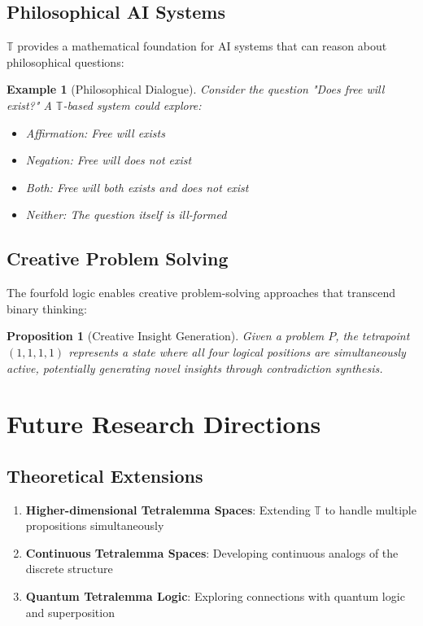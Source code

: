 \documentclass[11pt,a4paper]{article}
\newtheorem{proposition}{Proposition}
\newtheorem{example}{Example}
\begin{document}
\subsection{Philosophical AI Systems}

$\mathbb{T}$ provides a mathematical foundation for AI systems that can reason about philosophical questions:

\begin{example}[Philosophical Dialogue]
Consider the question "Does free will exist?" A $\mathbb{T}$-based system could explore:
\begin{itemize}
    \item Affirmation: Free will exists
    \item Negation: Free will does not exist
    \item Both: Free will both exists and does not exist
    \item Neither: The question itself is ill-formed
\end{itemize}
\end{example}

\subsection{Creative Problem Solving}

The fourfold logic enables creative problem-solving approaches that transcend binary thinking:

\begin{proposition}[Creative Insight Generation]
Given a problem $P$, the tetrapoint $(1, 1, 1, 1)$ represents a state where all four logical positions are simultaneously active, potentially generating novel insights through contradiction synthesis.
\end{proposition}

\section{Future Research Directions}

\subsection{Theoretical Extensions}

\begin{enumerate}
    \item \textbf{Higher-dimensional Tetralemma Spaces}: Extending $\mathbb{T}$ to handle multiple propositions simultaneously
    \item \textbf{Continuous Tetralemma Spaces}: Developing continuous analogs of the discrete structure
    \item \textbf{Quantum Tetralemma Logic}: Exploring connections with quantum logic and superposition
\end{enumerate}
\end{document}
